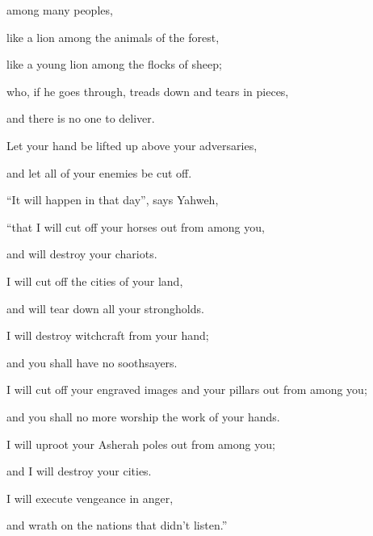 {\par }{\QB among many peoples,
\par }{\QB like a lion among the animals of the forest,
\par }{\QB like a young lion among the flocks of sheep;
\par }{\QB who, if he goes through, treads down and tears in pieces,
\par }{\QB and there is no one to deliver.
\par }{\Q {}Let your hand be lifted up above your adversaries,
\par }{\QB and let all of your enemies be cut off.
\par }{\Q {}“It will happen in that day”, says Yahweh,
\par }{\QB “that I will cut off your horses out from among you,
\par }{\QB and will destroy your chariots.
\par }{\Q {}I will cut off the cities of your land,
\par }{\QB and will tear down all your strongholds.
\par }{\Q {}I will destroy witchcraft from your hand;
\par }{\QB and you shall have no soothsayers.
\par }{\Q {}I will cut off your engraved images and your pillars out from among you;
\par }{\QB and you shall no more worship the work of your hands.
\par }{\Q {}I will uproot your Asherah poles out from among you;
\par }{\QB and I will destroy your cities.
\par }{\Q {}I will execute vengeance in anger,
\par }{\QB and wrath on the nations that didn’t listen.”

}
